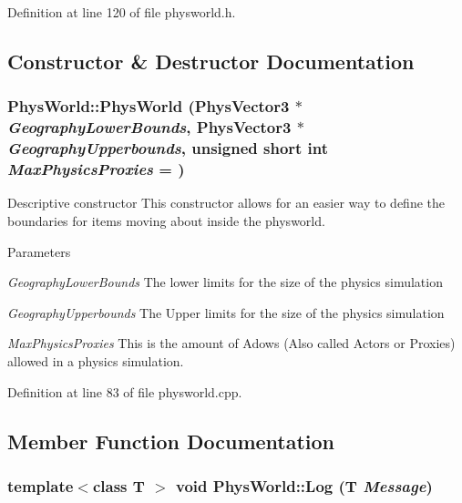 Definition at line 120 of file physworld.h.

\subsection{Constructor \& Destructor Documentation}
\hypertarget{classPhysWorld_a3228c98369082139722d3c918d735e6c}{
\subsubsection[{PhysWorld}]{\setlength{\rightskip}{0pt plus 5cm}PhysWorld::PhysWorld ({\bf PhysVector3} $\ast$ {\em GeographyLowerBounds}, \/  {\bf PhysVector3} $\ast$ {\em GeographyUpperbounds}, \/  unsigned short int {\em MaxPhysicsProxies} = {})}}
\label{db/df5/classPhysWorld_a3228c98369082139722d3c918d735e6c}


Descriptive constructor This constructor allows for an easier way to define the boundaries for items moving about inside the physworld. 
\begin{DoxyParams}{Parameters}
\item[{\em GeographyLowerBounds}]The lower limits for the size of the physics simulation \item[{\em GeographyUpperbounds}]The Upper limits for the size of the physics simulation \item[{\em MaxPhysicsProxies}]This is the amount of Adows (Also called Actors or Proxies) allowed in a physics simulation. \end{DoxyParams}


Definition at line 83 of file physworld.cpp.

\subsection{Member Function Documentation}
\hypertarget{classPhysWorld_a5e9fead1c3100f5dbd5ca985b82b85ea}{
\subsubsection[{Log}]{\setlength{\rightskip}{0pt plus 5cm}template$<$class T $>$ void PhysWorld::Log (T {\em Message})}}
\label{db/df5/classPhysWorld_a5e9fead1c3100f5dbd5ca985b82b85ea}


